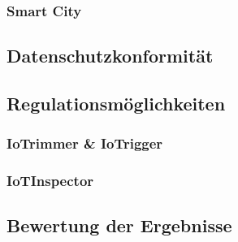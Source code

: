 \subsubsection{Smart City}
\label{sec:Hauptteil:ssec:Datenerhebung:sssec:Smart City}

\subsection{Datenschutzkonformität}
\label{sec:Hauptteil:ssec:Datenschutzkonformität}

\subsection{Regulationsmöglichkeiten}
\label{sec:Hauptteil:ssec:Regulationsmöglichkeiten}

\subsubsection{IoTrimmer \& IoTrigger}
\label{sec:Hauptteil:ssec:Regulationsmöglichkeiten:sssec:IoTrimmer und IoTrigger}

\subsubsection{IoTInspector}
\label{sec:Hauptteil:ssec:Regulationsmöglichkeiten:sssec:IoTInspector}

\subsection{Bewertung der Ergebnisse}
\label{sec:Hauptteil:ssec:Bewertung der Ergebnisse}

